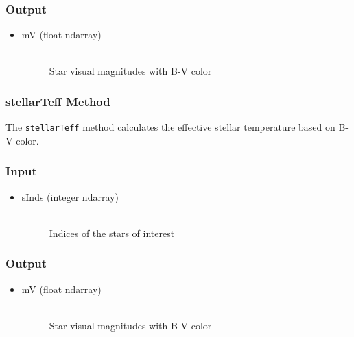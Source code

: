 \documentclass[cleanfoot]{asme2ej}
\begin{document}
\subsubsection*{Output}
\begin{itemize}
\item
\begin{description}
    \item[mV (float ndarray)] \hfill \\ Star visual magnitudes with B-V color
\end{description}
\end{itemize}

\subsubsection{stellarTeff Method} \label{sec:stellarTefftask}
The \verb+stellarTeff+ method calculates the effective stellar temperature based on B-V color.

\subsubsection*{Input}
\begin{itemize}
\item 
\begin{description}
    \item[sInds (integer ndarray)] \hfill \\ Indices of the stars of interest
\end{description}
\end{itemize}

\subsubsection*{Output}
\begin{itemize}
\item
\begin{description}
    \item[mV (float ndarray)] \hfill \\ Star visual magnitudes with B-V color
\end{description}
\end{itemize}



\end{document}
